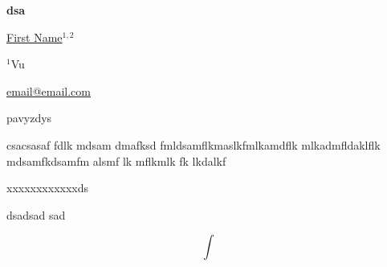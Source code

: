 \documentclass[12pt, twoside, a4paper, hidelinks]{article}
\begin{document}
\begin{center} \fontsize{14}{15}\selectfont \textbf{ dsa } \end{center}
\vspace{-0.8cm}

\begin{center} \fontsize{12}{13}\selectfont \underline{First Name}$^{1,2}$ \end{center}
\vspace{-.5cm}

\begin{center} \fontsize{10}{11}\selectfont $^{1}$Vu
    
    \underline{email@email.com} \end{center}

\fontsize{10}{11}\selectfont
pavyzdys 


csacsasaf fdlk mdsam dmafksd fmldsamflkmaslkfmlkamdflk mlkadmfldaklflk mdsamfkdsamfm alsmf lk mflkmlk fk lkdalkf

xxxxxxxxxxxxds

dsadsad
sad

\begin{equation}
\int
\end{equation}
\end{document}
